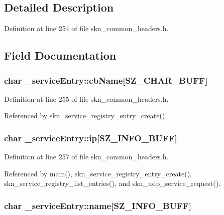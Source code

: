 \subsection{Detailed Description}


Definition at line 254 of file skn\+\_\+common\+\_\+headers.\+h.



\subsection{Field Documentation}
\hypertarget{struct__service_entry_ac654e9e33bf977ee6c36c46af83fbdd4}{
\subsubsection[{cb\+Name}]{\setlength{\rightskip}{0pt plus 5cm}char \+\_\+service\+Entry\+::cb\+Name\mbox{[}{\bf S\+Z\+\_\+\+C\+H\+A\+R\+\_\+\+B\+U\+F\+F}\mbox{]}}}\label{struct__service_entry_ac654e9e33bf977ee6c36c46af83fbdd4}


Definition at line 255 of file skn\+\_\+common\+\_\+headers.\+h.



Referenced by skn\+\_\+service\+\_\+registry\+\_\+entry\+\_\+create().

\hypertarget{struct__service_entry_a70b1db0895fbe31c07c8799cb57c678a}{
\subsubsection[{ip}]{\setlength{\rightskip}{0pt plus 5cm}char \+\_\+service\+Entry\+::ip\mbox{[}{\bf S\+Z\+\_\+\+I\+N\+F\+O\+\_\+\+B\+U\+F\+F}\mbox{]}}}\label{struct__service_entry_a70b1db0895fbe31c07c8799cb57c678a}


Definition at line 257 of file skn\+\_\+common\+\_\+headers.\+h.



Referenced by main(), skn\+\_\+service\+\_\+registry\+\_\+entry\+\_\+create(), skn\+\_\+service\+\_\+registry\+\_\+list\+\_\+entries(), and skn\+\_\+udp\+\_\+service\+\_\+request().

\hypertarget{struct__service_entry_aa66dcf0806f67276d049ac75c6153768}{
\subsubsection[{name}]{\setlength{\rightskip}{0pt plus 5cm}char \+\_\+service\+Entry\+::name\mbox{[}{\bf S\+Z\+\_\+\+I\+N\+F\+O\+\_\+\+B\+U\+F\+F}\mbox{]}}}\label{struct__service_entry_aa66dcf0806f67276d049ac75c6153768}


